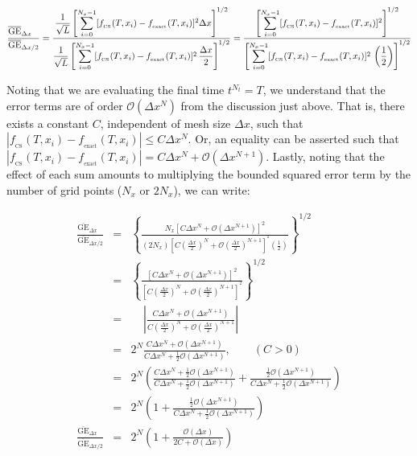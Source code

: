 \documentclass[11pt,titlepage]{report}
\begin{document}
$$\frac{\overline{\text{GE}}_{\Delta x\phantom{/2}}}{\overline{\text{GE}}_{\Delta x / 2}}  =   \frac{\mathlarger{\frac{1}{\sqrt{L}}}\left[\mathlarger{\sum}\limits_{i = 0}^{N_x - 1} [f_{_{\mathrm{CS}}}(T,x_i) - f_{_{\mathrm{exact}}}(T,x_i)]^2\Delta x\right]^{1/2}}{\mathlarger{\frac{1}{\sqrt{L}}}\left[\mathlarger{\sum}\limits_{i = 0}^{N_x - 1} [f_{_{\mathrm{CS}}}(T,x_i) - f_{_{\mathrm{exact}}}(T,x_i)]^2\,\mathlarger{\frac{\Delta x}{2}}\right]^{1/2}}  = \frac{\left[\mathlarger{\sum}\limits_{i = 0}^{N_x - 1} [f_{_{\mathrm{CS}}}(T,x_i) - f_{_{\mathrm{exact}}}(T,x_i)]^2\right]^{1/2}}{\left[\mathlarger{\sum}\limits_{i = 0}^{N_x - 1} [f_{_{\mathrm{CS}}}(T,x_i) - f_{_{\mathrm{exact}}}(T,x_i)]^2\,\left(\mathlarger{\frac{1}{2}}\right)\right]^{1/2}}$$


\noindent Noting that we are evaluating the final time $t^{N_t} = T$, we understand that the error terms are of order $\mathcal{O}(\Delta x^N)$ from the discussion just above. That is, there exists a constant $C$, independent of mesh size $\Delta x$, such that $|f_{_{\mathrm{CS}}}(T,x_i) - f_{_{\mathrm{exact}}}(T,x_i)| \leq C\Delta x^N$. Or, an equality can be asserted such that $|f_{_{\mathrm{CS}}}(T,x_i) - f_{_{\mathrm{exact}}}(T,x_i)| =  C\Delta x^N + \mathcal{O}(\Delta x^{N+1})$. Lastly, noting that the effect of each sum amounts to multiplying the bounded squared error term by the number of grid points ($N_x$ or $2N_x$), we can write:

\begin{eqnarray*}
\frac{\overline{\text{GE}}_{\Delta x\phantom{/2}}}{\overline{\text{GE}}_{\Delta x / 2}} & = & \left\{\frac{N_x[C\Delta x^N + \mathcal{O}(\Delta x^{N+1})]^2}{(2N_x)[C\left(\frac{\Delta x}{2}\right)^N + \mathcal{O}\left(\frac{\Delta x}{2}\right)^{N+1}]^{^2}\left(\frac{1}{2}\right)}\right\}^{1/2} \\[0.5em]
 & = & \left\{\frac{[C\Delta x^N + \mathcal{O}(\Delta x^{N+1})]^2}{[C\left(\frac{\Delta x}{2}\right)^N + \mathcal{O}\left(\frac{\Delta x}{2}\right)^{N+1}]^{^2}}\right\}^{1/2} \\[0.5em]
 & = & \phantom{2^N}\left|\frac{C\Delta x^N + \mathcal{O}(\Delta x^{N+1})}{C\left(\frac{\Delta x}{2}\right)^N + \mathcal{O}\left(\frac{\Delta x}{2}\right)^{N+1}}\right| \\[0.5em]
 & = & 2^N \frac{C\Delta x^N + \mathcal{O}(\Delta x^{N+1})}{C\Delta x^N + \tfrac{1}{2}\mathcal{O}(\Delta x^{N+1})}, \qquad (C > 0) \\[0.5em]
 & = & 2^N \left(\frac{C\Delta x^N + \tfrac{1}{2}\mathcal{O}(\Delta x^{N+1})}{C\Delta x^N + \tfrac{1}{2}\mathcal{O}(\Delta x^{N+1})} + \frac{\tfrac{1}{2}\mathcal{O}(\Delta x^{N+1})}{C\Delta x^N + \tfrac{1}{2}\mathcal{O}(\Delta x^{N+1})}\right)\\[0.5em]
 & = & 2^N\left(1  +  \frac{\tfrac{1}{2}\mathcal{O}(\Delta x^{N+1})}{C\Delta x^N + \tfrac{1}{2}\mathcal{O}(\Delta x^{N+1})}\right)\\[0.5em]
\frac{\overline{\text{GE}}_{\Delta x\phantom{/2}}}{\overline{\text{GE}}_{\Delta x / 2}} & = & 2^N\left(1  +  \frac{\mathcal{O}(\Delta x)}{2C + \mathcal{O}(\Delta x)}\right)\\
\end{eqnarray*}
\end{document}
